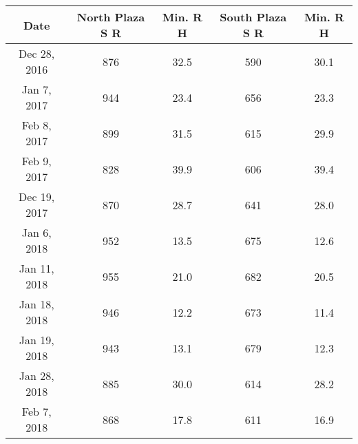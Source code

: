 \documentclass[twocolumn, a4paper]{article}
\begin{document}
	\begin{table}
	\scalebox{0.7}
	
	\begin{tabular}{|c||c|c||c|c|}
		\hline 
		 Date & North Plaza S R & Min. R H & South Plaza S R & Min. R H \\ 
		\hline 
		Dec 28, 2016 & 876 & 32.5 & 590 & 30.1 \\ 
		\hline 
		Jan 7, 2017 & 944 & 23.4 & 656 & 23.3 \\ 
		\hline 
		Feb 8, 2017 & 899 & 31.5 & 615 & 29.9 \\ 
		\hline 
		Feb 9, 2017 & 828 & 39.9 & 606 & 39.4 \\ 
		\hline 
		Dec 19, 2017 & 870 & 28.7 & 641 & 28.0 \\ 
		\hline 
		Jan 6, 2018 & 952 & 13.5 & 675 & 12.6 \\ 
		\hline 
		Jan 11, 2018 & 955 & 21.0 & 682 & 20.5 \\ 
		\hline 
		Jan 18, 2018 & 946 & 12.2 & 673 & 11.4 \\ 
		\hline 
		Jan 19, 2018 & 943 & 13.1 & 679 & 12.3 \\ 
		\hline 
		Jan 28, 2018 & 885 & 30.0 & 614 & 28.2 \\ 
		\hline 
		Feb 7, 2018 & 868 & 17.8 & 611 & 16.9 \\ 
		\hline 
	\end{tabular} 
\end{table}
\end{document}
